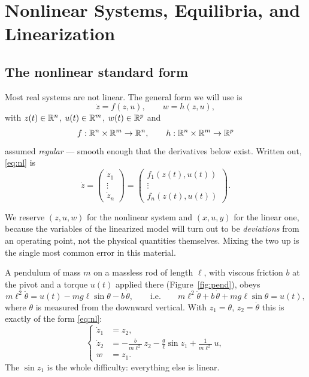 \documentclass[11pt]{article}
\begin{document}
\section{Nonlinear Systems, Equilibria, and Linearization}\label{sec:nonlinear}

\subsection{The nonlinear standard form}
Most real systems are not linear. The general form we will use is
\begin{equation}\label{eq:nl}
   \dot z = f(z,u),\qquad w = h(z,u),
\end{equation}
with $z(t)\in\mathbb{R}^{n}$, $u(t)\in\mathbb{R}^{m}$, $w(t)\in\mathbb{R}^{p}$ and
\[
   f:\mathbb{R}^{n}\times\mathbb{R}^{m}\to\mathbb{R}^{n},\qquad h:\mathbb{R}^{n}\times\mathbb{R}^{m}\to\mathbb{R}^{p}
\]
assumed \emph{regular} --- smooth enough that the derivatives below exist. Written
out, \eqref{eq:nl} is
\[
   \dot z=\begin{pmatrix}\dot z_1\\ \vdots\\ \dot z_n\end{pmatrix}
        =\begin{pmatrix}f_1(z(t),u(t))\\ \vdots\\ f_n(z(t),u(t))\end{pmatrix}.
\]

\begin{note}
We reserve $(z,u,w)$ for the nonlinear system and $(x,u,y)$ for the linear one,
because the variables of the linearized model will turn out to be
\emph{deviations} from an operating point, not the physical quantities themselves.
Mixing the two up is the single most common error in this material.
\end{note}

\begin{example}[pendulum]\label{ex:pend}
A pendulum of mass $m$ on a massless rod of length $\ell$, with viscous friction
$b$ at the pivot and a torque $u(t)$ applied there (Figure~\ref{fig:pend}), obeys
\[
   m\ell^{2}\ddot\theta = u(t) - mg\ell\sin\theta - b\,\dot\theta,
   \qquad\text{i.e.}\qquad
   m\ell^{2}\ddot\theta + b\,\dot\theta + mg\ell\sin\theta = u(t),
\]
where $\theta$ is measured from the downward vertical. With $z_1=\theta$,
$z_2=\dot\theta$ this is exactly of the form \eqref{eq:nl}:
\begin{equation}\label{eq:pendstate}
\left\{
\begin{aligned}
   \dot z_1 &= z_2,\\
   \dot z_2 &= -\frac{b}{m\ell^{2}}\,z_2 - \frac{g}{\ell}\sin z_1
               + \frac{1}{m\ell^{2}}\,u,\\
   w &= z_1 .
\end{aligned}\right.
\end{equation}
The $\sin z_1$ is the whole difficulty: everything else is linear.
\end{example}
\end{document}
